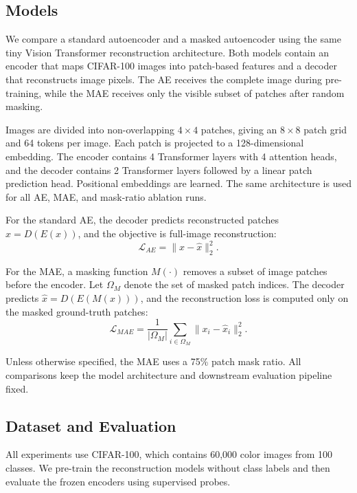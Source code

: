 \documentclass[10pt,twocolumn,letterpaper]{article}
\begin{document}
\subsection{Models}

We compare a standard autoencoder and a masked autoencoder using the same tiny Vision Transformer reconstruction architecture. Both models contain an encoder that maps CIFAR-100 images into patch-based features and a decoder that reconstructs image pixels. The AE receives the complete image during pre-training, while the MAE receives only the visible subset of patches after random masking.

Images are divided into non-overlapping $4 \times 4$ patches, giving an $8 \times 8$ patch grid and 64 tokens per image. Each patch is projected to a 128-dimensional embedding. The encoder contains 4 Transformer layers with 4 attention heads, and the decoder contains 2 Transformer layers followed by a linear patch prediction head. Positional embeddings are learned. The same architecture is used for all AE, MAE, and mask-ratio ablation runs.

For the standard AE, the decoder predicts reconstructed patches $\hat{x}=D(E(x))$, and the objective is full-image reconstruction:
\begin{equation}
    \mathcal{L}_{AE} = \lVert x - \hat{x} \rVert_2^2 .
\end{equation}

For the MAE, a masking function $M(\cdot)$ removes a subset of image patches before the encoder. Let $\Omega_M$ denote the set of masked patch indices. The decoder predicts $\hat{x}=D(E(M(x)))$, and the reconstruction loss is computed only on the masked ground-truth patches:
\begin{equation}
    \mathcal{L}_{MAE} =
    \frac{1}{|\Omega_M|}
    \sum_{i \in \Omega_M}
    \lVert x_i - \hat{x}_i \rVert_2^2 .
\end{equation}

Unless otherwise specified, the MAE uses a 75\% patch mask ratio. All comparisons keep the model architecture and downstream evaluation pipeline fixed.

\subsection{Dataset and Evaluation}

All experiments use CIFAR-100, which contains 60,000 color images from 100 classes. We pre-train the reconstruction models without class labels and then evaluate the frozen encoders using supervised probes.
\end{document}
